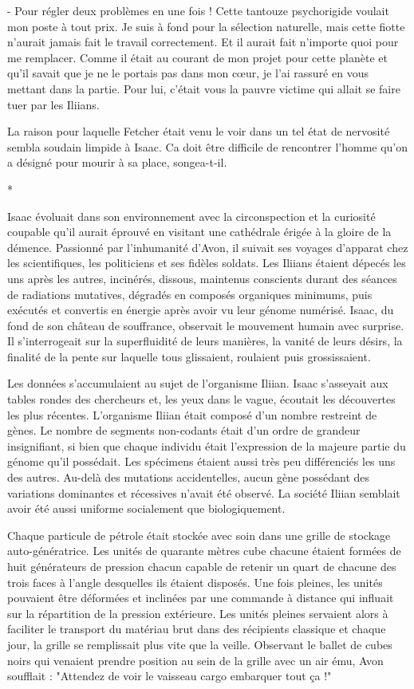 \documentclass[12pt]{book}
\newcommand{\s}{\begin{center}
*
\end{center}
}
\begin{document}
- Pour régler deux problèmes en une fois ! Cette tantouze psychorigide voulait mon poste à tout prix. Je suis à fond pour la sélection naturelle, mais cette fiotte n'aurait jamais fait le travail correctement. Et il aurait fait n'importe quoi pour me remplacer. Comme il était au courant de mon projet pour cette planète et qu'il savait que je ne le portais pas dans mon cœur, je l'ai rassuré en vous mettant dans la partie. Pour lui, c'était vous la pauvre victime qui allait se faire tuer par les Iliians.


La raison pour laquelle Fetcher était venu le voir dans un tel état de nervosité sembla soudain limpide à Isaac. Ca doit être difficile de rencontrer l'homme qu'on a désigné pour mourir à sa place, songea-t-il.


\s


Isaac évoluait dans son environnement avec la circonspection et la curiosité coupable qu'il aurait éprouvé en visitant une cathédrale érigée à la gloire de la démence. Passionné par l'inhumanité d'Avon, il suivait ses voyages d'apparat chez les scientifiques, les politiciens et ses fidèles soldats. Les Iliians étaient dépecés les uns après les autres, incinérés, dissous, maintenus conscients durant des séances de radiations mutatives, dégradés en composés organiques minimums, puis exécutés et convertis en énergie après avoir vu leur génome numérisé. Isaac, du fond de son château de souffrance, observait le mouvement humain avec surprise. Il s'interrogeait sur la superfluidité de leurs manières, la vanité de leurs désirs, la finalité de la pente sur laquelle tous glissaient, roulaient puis grossissaient.


Les données s'accumulaient au sujet de l'organisme Iliian. Isaac s'asseyait aux tables rondes des chercheurs et, les yeux dans le vague, écoutait les découvertes les plus récentes. L'organisme Iliian était composé d'un nombre restreint de gènes. Le nombre de segments non-codants était d'un ordre de grandeur insignifiant, si bien que chaque individu était l'expression de la majeure partie du génome qu'il possédait. Les spécimens étaient aussi très peu différenciés les uns des autres. Au-delà des mutations accidentelles, aucun gène possédant des variations dominantes et récessives n'avait été observé. La société Iliian semblait avoir été aussi uniforme socialement que biologiquement.


Chaque particule de pétrole était stockée avec soin dans une grille de stockage auto-génératrice. Les unités de quarante mètres cube chacune étaient formées de huit générateurs de pression chacun capable de retenir un quart de chacune des trois faces à l'angle desquelles ils étaient disposés. Une fois pleines, les unités pouvaient être déformées et inclinées par une commande à distance qui influait sur la répartition de la pression extérieure. Les unités pleines servaient alors à faciliter le transport du matériau brut dans des récipients classique et chaque jour, la grille se remplissait plus vite que la veille. Observant le ballet de cubes noirs qui venaient prendre position au sein de la grille avec un air ému, Avon soufflait : "Attendez de voir le vaisseau cargo embarquer tout ça !"
\end{document}
